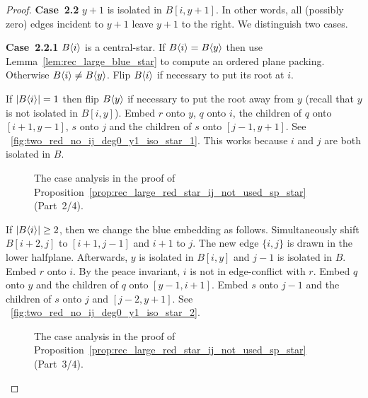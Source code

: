 \documentclass[11pt,a4paper,colorlinks=true,urlcolor=blue,citecolor=red]{article}
\theoremstyle{plain}
\newcommand{\case}[1]{\par\vspace{.5\baselineskip}\noindent\textbf{\sffamily Case~#1}}
\begin{document}
\begin{proof}
  \case{2.2} $y+1$ is isolated in $B[i,y+1]$. In other words, all
  (possibly zero) edges incident to $y+1$ leave $y+1$ to the right. We
  distinguish two cases.

  \case{2.2.1} $B\langle{i}\rangle$ is a central-star. If
  $B\langle{i}\rangle=B\langle{y}\rangle$ then use Lemma~\ref{lem:rec_large_blue_star}
  to compute an ordered plane packing. Otherwise
  $B\langle{i}\rangle\neq B\langle{y}\rangle$. Flip $B\langle{i}\rangle$ if necessary to put
  its root at $i$.

  If $|B\langle{i}\rangle|=1$ then flip $B\langle{y}\rangle$ if necessary to put the
  root away from $y$ (recall that $y$ is not isolated in $B[i,y]$).
  Embed $r$ onto $y$, $q$ onto $i$, the children of $q$ onto
  $[i+1,y-1]$, $s$ onto $j$ and the children of $s$ onto $[j-1,y+1]$.
  See \figurename~\ref{fig:two_red_no_ij_deg0_y1_iso_star_1}. This works
  because $i$ and $j$ are both isolated in $B$.

  \begin{figure}
    \centering\hfil {}\hfil {}\hfil \label{fig:two_red_no_ij_2}
    \caption{The case analysis in the proof of
      Proposition~\ref{prop:rec_large_red_star_ij_not_used_sp_star}
      (Part~2/4).}
  \end{figure}

  If $|B\langle{i}\rangle|\geq 2$, then we change the blue embedding as follows.
  Simultaneously shift $B[i+2,j]$ to $[i+1,j-1]$ and $i+1$ to $j$. The
  new edge $\{i,j\}$ is drawn in the lower halfplane. Afterwards, $y$ is
  isolated in $B[i,y]$ and $j-1$ is isolated in $B$. Embed $r$ onto
  $i$. By the peace invariant, $i$ is not in edge-conflict with
  $r$. Embed $q$ onto $y$ and the children of $q$ onto $[y-1,i+1]$.
  Embed $s$ onto $j-1$ and the children of $s$ onto $j$ and $[j-2,y+1]$.
  See \figurename~\ref{fig:two_red_no_ij_deg0_y1_iso_star_2}.

  \begin{figure}
    \centering\hfil {}\hfil {}\hfil {}\hfil {}\hfil \label{fig:two_red_no_ij_3}
    \caption{The case analysis in the proof of
      Proposition~\ref{prop:rec_large_red_star_ij_not_used_sp_star}
      (Part~3/4).}
  \end{figure}



\end{proof}
\end{document}
